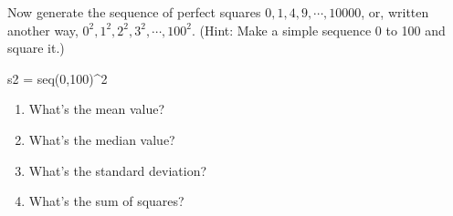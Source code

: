Now generate the sequence of perfect squares $0, 1, 4, 9, \cdots, 10000$,
or, written another way, $0^2, 1^2, 2^2, 3^2, \cdots, 100^2$.  (Hint:
Make a simple sequence 0 to 100 and square it.)

\begin{AnswerText}
\begin{Schunk}
\begin{Sinput}
  s2 = seq(0,100)^2
\end{Sinput}
\end{Schunk}
\end{AnswerText}


\begin{enumerate}

\item What's the mean value?\\ 

\item What's the median value?\\

\item What's the standard deviation?\\ 

\item What's the sum of squares?\\
\end{enumerate}


